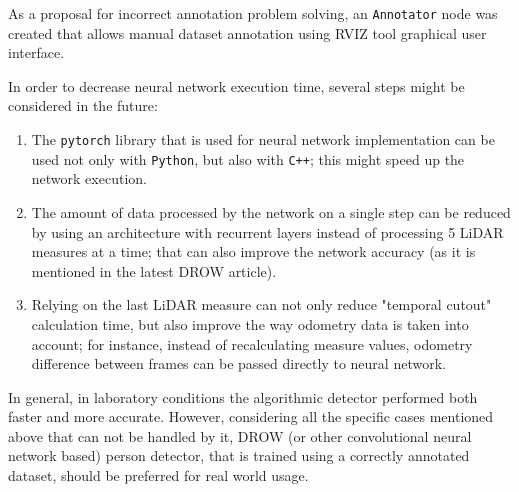 \documentclass{article}
\begin{document}
As a proposal for incorrect annotation problem solving, an \texttt{Annotator} node was created that allows manual dataset annotation using RVIZ tool graphical user interface.

In order to decrease neural network execution time, several steps might be considered in the future:
\begin{enumerate}
    \item The \texttt{pytorch} library that is used for neural network implementation can be used not only with \texttt{Python}, but also with \texttt{C++}; this might speed up the network execution.
    \item The amount of data processed by the network on a single step can be reduced by using an architecture with recurrent layers instead of processing 5 LiDAR measures at a time; that can also improve the network accuracy (as it is mentioned in the latest DROW article)\cite{DROW_2018}.
    \item Relying on the last LiDAR measure can not only reduce "temporal cutout" calculation time, but also improve the way odometry data is taken into account; for instance, instead of recalculating measure values, odometry difference between frames can be passed directly to neural network.
\end{enumerate}

In general, in laboratory conditions the algorithmic detector performed both faster and more accurate.
However, considering all the specific cases mentioned above that can not be handled by it, DROW (or other convolutional neural network based) person detector, that is trained using a correctly annotated dataset, should be preferred for real world usage.

\clearpage



\end{document}
